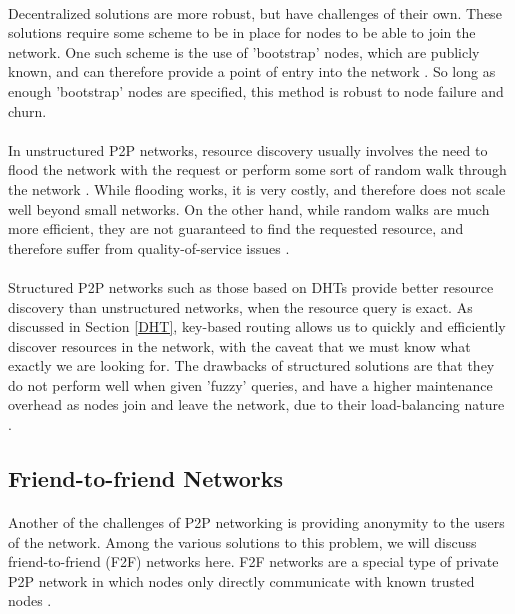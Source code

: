 \documentclass[12pt,letterpaper]{article}
\begin{document}
\paragraph{}
Decentralized solutions are more robust, but have challenges of their own.
These solutions require some scheme to be in place for nodes to be able to join the network.
One such scheme is the use of 'bootstrap' nodes, which are publicly known, and can therefore provide a point of entry into the network \cite{dht-ietf}.
So long as enough 'bootstrap' nodes are specified, this method is robust to node failure and churn.

\paragraph{}
In unstructured P2P networks, resource discovery usually involves the need to flood the network with the request or perform some sort of random walk through the network \cite{resource}\cite{resource-mobile}.
While flooding works, it is very costly, and therefore does not scale well beyond small networks.
On the other hand, while random walks are much more efficient, they are not guaranteed to find the requested resource, and therefore suffer from quality-of-service issues \cite{resource}.

\paragraph{}
Structured P2P networks such as those based on DHTs provide better resource discovery than unstructured networks, when the resource query is exact.
As discussed in Section \ref{DHT}, key-based routing allows us to quickly and efficiently discover resources in the network, with the caveat that we must know what exactly we are looking for.
The drawbacks of structured solutions are that they do not perform well when given 'fuzzy' queries, and have a higher maintenance overhead as nodes join and leave the network, due to their load-balancing nature \cite{resource}\cite{resource-mobile}.

\subsection{Friend-to-friend Networks}

\paragraph{}
Another of the challenges of P2P networking is providing anonymity to the users of the network.
Among the various solutions to this problem, we will discuss friend-to-friend (F2F) networks here.
F2F networks are a special type of private P2P network in which nodes only directly communicate with known trusted nodes \cite{wiki-f2f}.
\end{document}
